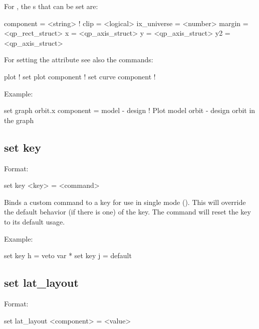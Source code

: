 {{For , the s that can be set are:
\begin{example}
  component   = <string>     ! 
  clip        = <logical>
  ix_universe = <number>
  margin      = <qp_rect_struct>
  x           = <qp_axis_struct>
  y           = <qp_axis_struct>
  y2          = <qp_axis_struct>
\end{example}

For setting the  attribute see also the commands:
\begin{example}
  plot                    ! 
  set plot component      ! 
  set curve component     ! 
\end{example}

Example:
\begin{example}
  set graph orbit.x component = model - design  
                          ! Plot model orbit - design orbit in the graph
\end{example}



\subsection{set key}
\label{s:set.key}

Format:
\begin{example}
  set key <key> = <command>
\end{example}

Binds a custom command to a key for use in single mode ().  This will
override the default behavior (if there is one) of the key.  The command  will
reset the key to its default usage.

Example:
\begin{example}
  set key h = veto var *
  set key j = default
\end{example}



\subsection{set lat_layout}
\label{s:set.lat.layout}

Format:
\begin{example}
  set lat_layout <component> = <value>
\end{example}

}}
